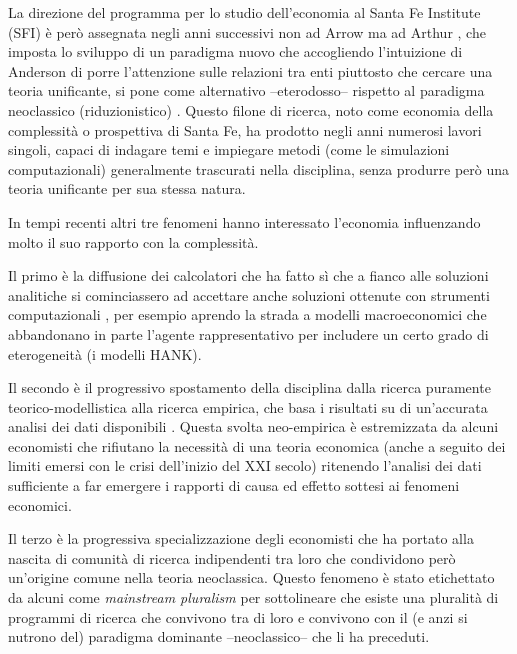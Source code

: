 \documentclass[a4paper, headings=standardclasses]{scrartcl}
\begin{document}
La direzione del programma per lo studio dell'economia al Santa Fe Institute (SFI) è però assegnata negli anni successivi non ad Arrow ma ad Arthur \parencite{fontana2010a}, che imposta lo sviluppo di un paradigma nuovo che accogliendo l'intuizione di Anderson di porre l'attenzione sulle relazioni tra enti piuttosto che cercare una teoria unificante, si pone come alternativo --eterodosso-- rispetto al paradigma neoclassico (riduzionistico) \parencite{arthur2021, fontana2010}.
Questo filone di ricerca, noto come economia della complessità o prospettiva di Santa Fe, ha prodotto negli anni numerosi lavori singoli, capaci di indagare temi e impiegare metodi (come le simulazioni computazionali) generalmente trascurati nella disciplina, senza produrre però una teoria unificante per sua stessa natura.

In tempi recenti altri tre fenomeni hanno interessato l'economia influenzando molto il suo rapporto con la complessità.

Il primo è la diffusione dei calcolatori che ha fatto sì che a fianco alle soluzioni analitiche si cominciassero ad accettare anche soluzioni ottenute con strumenti computazionali \parencite{cherrier2023, backhouse2016}, per esempio aprendo la strada a modelli macroeconomici che abbandonano in parte l'agente rappresentativo per includere un certo grado di eterogeneità (i modelli HANK).

Il secondo è il progressivo spostamento della disciplina dalla ricerca puramente teorico-model\-listica alla ricerca empirica, che basa i risultati su di un'accurata analisi dei dati disponibili \parencite{cherrier2018, backhouse2017}.
Questa svolta neo-empirica è estremizzata da alcuni economisti che rifiutano la necessità di una teoria economica (anche a seguito dei limiti emersi con le crisi dell'inizio del XXI secolo) ritenendo l'analisi dei dati sufficiente a far emergere i rapporti di causa ed effetto sottesi ai fenomeni economici.

Il terzo è la progressiva specializzazione degli economisti che ha portato alla nascita di comunità di ricerca indipendenti tra loro che condividono però un'origine comune nella teoria neoclassica. Questo fenomeno è stato etichettato da alcuni come \textit{mainstream pluralism} \parencite{cedrini2018, davis2006, davis2019a} per sottolineare che esiste una pluralità di programmi di ricerca che convivono tra di loro e convivono con il (e anzi si nutrono del) paradigma dominante --neoclassico-- che li ha preceduti.
\end{document}
